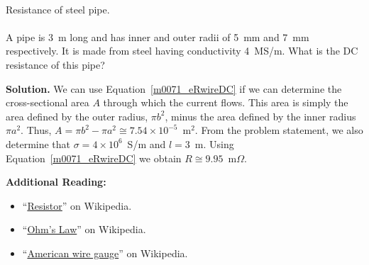 ~\\ \begin{example} 
\begin{mdframed}[backgroundcolor=brown!20,linecolor=brown!20]\raggedright
Resistance of steel 
pipe.
\\~\\
A pipe is 3~m long and has inner and outer radii of 5~mm and 7~mm respectively.
It is made from steel having conductivity 4~MS/m. 
What is the DC resistance of this pipe? 

{\bf Solution.} 
We can use Equation~\ref{m0071_eRwireDC} if we can determine the cross-sectional area $A$ through which the current flows.
This area is simply the area defined by the outer radius, $\pi b^2$, minus the area defined by the inner radius $\pi a^2$.
Thus, $A = \pi b^2 - \pi a^2 \cong 7.54 \times 10^{-5}$~m$^2$.
From the problem statement, we also determine that
$\sigma=4\times 10^6$~S/m and 
$l=3$~m.
Using Equation~\ref{m0071_eRwireDC} we obtain $R \cong 9.95$~m$\Omega$.
\end{mdframed}\end{example}


{\bf Additional Reading:}
\begin{itemize}
\item ``\href{https://en.wikipedia.org/wiki/Resistor}{Resistor}'' on Wikipedia.
\item ``\href{https://en.wikipedia.org/wiki/Ohm's_law}{Ohm's Law}'' on Wikipedia.
\item ``\href{https://en.wikipedia.org/wiki/American_wire_gauge}{American wire gauge}'' on Wikipedia.
\end{itemize}


